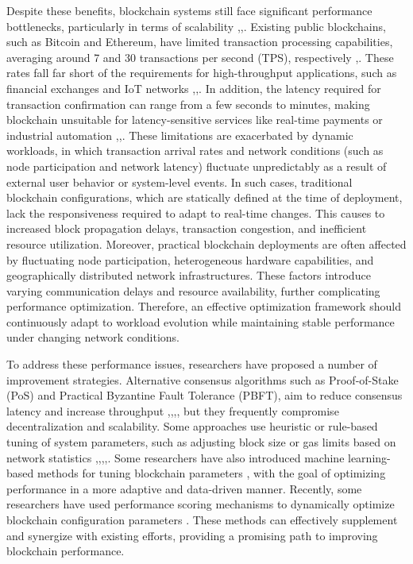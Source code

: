 \documentclass[a4paper,fleqn]{cas-dc}
\begin{document}
Despite these benefits, blockchain systems still face significant performance bottlenecks, particularly in terms of scalability \citep{park2024watchdog},\citep{choi2023lmpt},\citep{liu2021hypermaze}. Existing public blockchains, such as Bitcoin and Ethereum, have limited transaction processing capabilities, averaging around 7 and 30 transactions per second (TPS), respectively \citep{nakamoto2008bitcoin},\citep{buterin2013ethereum}. These rates fall far short of the requirements for high-throughput applications, such as financial exchanges and IoT networks \citep{begum2022systematic},\citep{ni2022novel},\citep{an2024rlchain}. In addition, the latency required for transaction confirmation can range from a few seconds to minutes, making blockchain unsuitable for latency-sensitive services like real-time payments or industrial automation \citep{chen2019collaborative},\citep{yang2022blockchain},\citep{liao2024rt}. These limitations are exacerbated by dynamic workloads, in which transaction arrival rates and network conditions (such as node participation and network latency) fluctuate unpredictably as a result of external user behavior or system-level events. In such cases, traditional blockchain configurations, which are statically defined at the time of deployment, lack the responsiveness required to adapt to real-time changes. This causes to increased block propagation delays, transaction congestion, and inefficient resource utilization. Moreover, practical blockchain deployments are often affected by fluctuating node participation, heterogeneous hardware capabilities, and geographically distributed network infrastructures. These factors introduce varying communication delays and resource availability, further complicating performance optimization. Therefore, an effective optimization framework should continuously adapt to workload evolution while maintaining stable performance under changing network conditions.



To address these performance issues, researchers have proposed a number of improvement strategies. Alternative consensus algorithms such as Proof-of-Stake (PoS) and Practical Byzantine Fault Tolerance (PBFT), aim to reduce consensus latency and increase throughput \citep{xu2023adaptchain},\citep{gao2021sharding},\citep{zhang2021trustworthy},\citep{dai2024wahoo}, but they frequently compromise decentralization and scalability. Some approaches use heuristic or rule-based tuning of system parameters, such as adjusting block size or gas limits based on network statistics \citep{chen2023decision},\citep{monem2024sustainable},\citep{jamil2022improving},\citep{chen2022latency},\citep{wilhelmi2022end}. Some researchers have also introduced machine learning-based methods for tuning blockchain parameters \citep{wang2022bpr}, with the goal of optimizing performance in a more adaptive and data-driven manner. Recently, some researchers have used performance scoring mechanisms to dynamically optimize blockchain configuration parameters \citep{wang2023learningchain}. These methods can effectively supplement and synergize with existing efforts, providing a promising path to improving blockchain performance.
\end{document}

